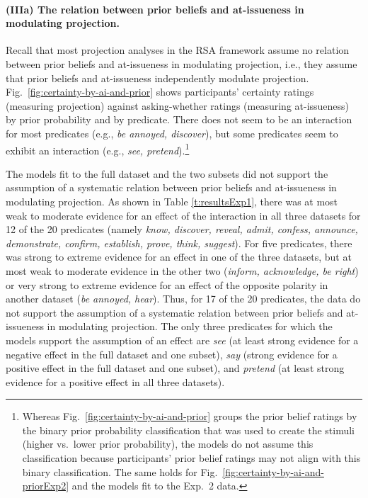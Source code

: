 \documentclass[11pt,fleqn]{article}
\newcommand{\6}{\mbox{$[\hspace*{-.6mm}[$}}
\newcommand{\9}{\mbox{$]\hspace*{-.6mm}]$}}
\begin{document}
\paragraph{(IIIa) The relation between prior beliefs and at-issueness in modulating projection.} Recall that most projection analyses in the RSA framework assume no relation between prior beliefs and at-issueness in modulating projection, i.e., they assume that prior beliefs and at-issueness independently modulate projection. Fig.~\ref{fig:certainty-by-ai-and-prior} shows participants' certainty ratings (measuring projection) against asking-whether ratings (measuring at-issueness) by prior probability and by predicate. There does not seem to be an interaction for most predicates (e.g., {\em be annoyed, discover}), but some predicates seem to exhibit an interaction (e.g., {\em see, pretend}).\footnote{Whereas Fig.~\ref{fig:certainty-by-ai-and-prior} groups the prior belief ratings by the binary prior probability classification that was used to create the stimuli (higher vs.\ lower prior probability), the models  do not assume this classification because participants' prior belief ratings may not align with this binary classification. The same holds for Fig.~\ref{fig:certainty-by-ai-and-priorExp2} and the models fit to the Exp.~2 data.}

The models fit to the full dataset and the two subsets did not support the assumption of a systematic relation between prior beliefs and at-issueness in modulating projection. As shown in Table \ref{t:resultsExp1}, there was at most weak to moderate evidence for an effect of the interaction in all three datasets for 12 of the 20 predicates (namely {\em know, discover, reveal, admit, confess, announce, demonstrate, confirm, establish, prove, think, suggest}). For five predicates, there was strong to extreme evidence for an effect in one of the three datasets, but at most weak to moderate evidence in the other two ({\em inform, acknowledge, be right}) or very strong to extreme evidence for an effect of the opposite polarity in another dataset ({\em be annoyed, hear}).  Thus, for 17 of the 20 predicates, the data do not support the assumption of a systematic relation between prior beliefs and at-issueness in modulating projection. The only three predicates for which the models support the assumption of an effect are {\em see} (at least strong evidence for a negative effect in the full dataset and one subset), {\em say} (strong evidence for a positive effect in the full dataset and one subset), and {\em pretend} (at least strong evidence for a positive effect in all three datasets). 
\end{document}
